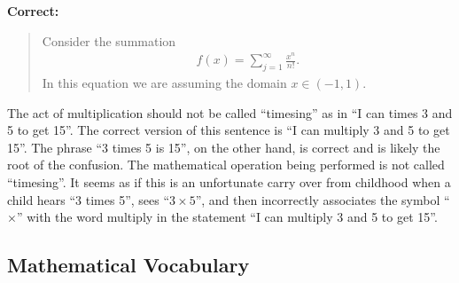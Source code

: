 \documentclass[
]{book}
\theoremstyle{definition}
\theoremstyle{definition}
\theoremstyle{definition}
\theoremstyle{remark}
\begin{document}
\begin{description}
\textbf{Correct:}

\begin{quote}
Consider the summation \[\begin{aligned}
 f(x) = \sum_{j=1}^\infty \frac{x^n}{n!}.\end{aligned}\]
In this equation we are assuming the domain
\(x \in (-1,1).\)
\end{quote}
\item[``Timesing'':]
The act of multiplication should not be called ``timesing'' as in ``I
can times 3 and 5 to get 15''. The correct version of this sentence
is ``I can multiply 3 and 5 to get 15''. The phrase ``3 times 5 is 15'',
on the other hand, is correct and is likely the root of the
confusion. The mathematical operation being performed is not called
``timesing''. It seems as if this is an unfortunate carry over from
childhood when a child hears ``3 times 5'', sees ``\(3  \times 5\)'', and then incorrectly associates the symbol
``\(\times\)'' with the word multiply in the statement ``I can multiply 3
and 5 to get 15''.
\end{description}

\hypertarget{mathematical-vocabulary}{%
\subsection{Mathematical Vocabulary}\label{mathematical-vocabulary}}
\end{document}
